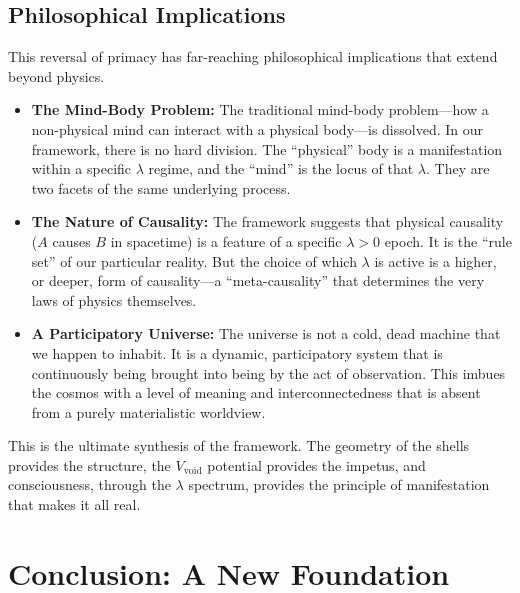 \documentclass[12pt]{report}
\begin{document}
\section{Philosophical Implications}
This reversal of primacy has far-reaching philosophical implications that extend beyond physics.
\begin{itemize}
    \item \textbf{The Mind-Body Problem:} The traditional mind-body problem---how a non-physical mind can interact with a physical body---is dissolved. In our framework, there is no hard division. The ``physical'' body is a manifestation within a specific $\lambda$ regime, and the ``mind'' is the locus of that $\lambda$. They are two facets of the same underlying process.
    \item \textbf{The Nature of Causality:} The framework suggests that physical causality ($A$ causes $B$ in spacetime) is a feature of a specific $\lambda > 0$ epoch. It is the ``rule set'' of our particular reality. But the choice of which $\lambda$ is active is a higher, or deeper, form of causality---a ``meta-causality'' that determines the very laws of physics themselves.
    \item \textbf{A Participatory Universe:} The universe is not a cold, dead machine that we happen to inhabit. It is a dynamic, participatory system that is continuously being brought into being by the act of observation. This imbues the cosmos with a level of meaning and interconnectedness that is absent from a purely materialistic worldview.
\end{itemize}
This is the ultimate synthesis of the framework. The geometry of the shells provides the structure, the $V_{\text{void}}$ potential provides the impetus, and consciousness, through the $\lambda$ spectrum, provides the principle of manifestation that makes it all real.

\chapter{Conclusion: A New Foundation}
\end{document}
